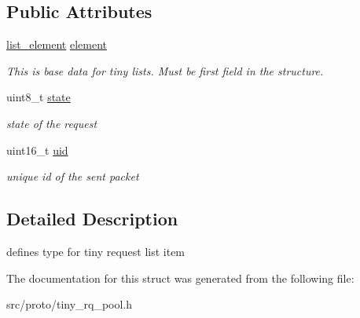 \subsection*{Public Attributes}
\begin{DoxyCompactItemize}
\item 
\mbox{\label{structtiny__request___a02c8fb6d26d0cfb0264423a1cb643159}} 
\hyperlink{structlist__element__}{list\+\_\+element} \hyperlink{structtiny__request___a02c8fb6d26d0cfb0264423a1cb643159}{element}
\begin{DoxyCompactList}\small\item\em This is base data for tiny lists. Must be first field in the structure. \end{DoxyCompactList}\item 
\mbox{\label{structtiny__request___a019207b55569a48a82a2922dd3cc7eb2}} 
uint8\+\_\+t \hyperlink{structtiny__request___a019207b55569a48a82a2922dd3cc7eb2}{state}
\begin{DoxyCompactList}\small\item\em state of the request \end{DoxyCompactList}\item 
\mbox{\label{structtiny__request___aefa85d07e09d6772963532b6cf1ed125}} 
uint16\+\_\+t \hyperlink{structtiny__request___aefa85d07e09d6772963532b6cf1ed125}{uid}
\begin{DoxyCompactList}\small\item\em unique id of the sent packet \end{DoxyCompactList}\end{DoxyCompactItemize}


\subsection{Detailed Description}
defines type for tiny request list item 

The documentation for this struct was generated from the following file\+:\begin{DoxyCompactItemize}
\item 
src/proto/tiny\+\_\+rq\+\_\+pool.\+h\end{DoxyCompactItemize}
